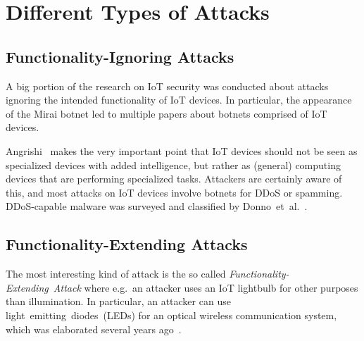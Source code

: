\documentclass[11pt,a4paper]{article}
\begin{document}
	\section{Different Types of Attacks}
	\label{sec:attack_types}

	\subsection{Functionality-Ignoring Attacks}
	\label{sec:functionality_ignoring_attacks}
	A big portion of the research on IoT security was conducted about attacks ignoring the intended functionality of IoT devices. In particular, the appearance of the Mirai botnet \cite{Antonakakis:2017:UMB} led to multiple papers about botnets comprised of IoT devices.
	
	Angrishi~\cite{Angrishi:2017:TitiiiviIb} makes the very important point that IoT devices should not be seen as specialized devices with added intelligence, but rather as (general) computing devices that are performing specialized tasks.
	Attackers are certainly aware of this, and most attacks on IoT devices involve botnets for DDoS or spamming. DDoS-capable malware was surveyed and classified by Donno~et~al.~\cite{Donno:2017:ADIM}.
    
    

	
	\subsection{Functionality-Extending Attacks}
	\label{sec:functionality_extending_attacks}
    The most interesting kind of attack is the so called \textit{Functionality-Extending~Attack} where e.g.\ an attacker uses an IoT lightbulb for other purposes than illumination.
	In particular, an attacker can use light~emitting~diodes~(LEDs) for an optical wireless communication system, which was elaborated several years ago~\cite{Komine:2004:FAfVLCSuLL, Elgala:2007:OVLWCBoWL}. 
	
\end{document}
